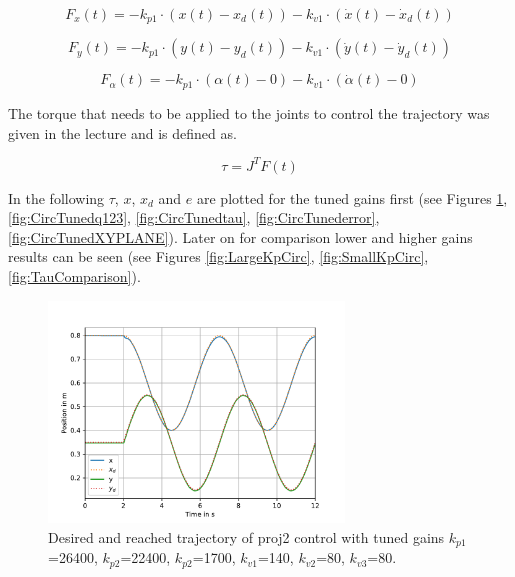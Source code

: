 \begin{equation}
    F_x(t)=-k_{p1}\cdot(x(t)-x_d(t)) - k_{v1}\cdot(\dot{x}(t) - \dot{x}_d(t))
\end{equation}

\begin{equation}
    F_y(t)=-k_{p1}\cdot(y(t)-y_d(t)) - k_{v1}\cdot(\dot{y}(t) - \dot{y}_d(t))
\end{equation}

\begin{equation}
    F_\alpha(t)=-k_{p1}\cdot(\alpha(t)-0) - k_{v1}\cdot(\dot{\alpha}(t) - 0)
\end{equation}

The torque that needs to be applied to the joints to control the trajectory was given in the lecture and is defined as.

\begin{equation}
    \tau= J^TF(t)
\end{equation}


In the following $\tau$, $x$, $x_d$ and $e$ are plotted for the tuned gains first (see Figures \ref{fig:CircTunedXXD}, \ref{fig:CircTunedq123}, \ref{fig:CircTunedtau}, \ref{fig:CircTunederror}, \ref{fig:CircTunedXYPLANE}). Later on for comparison lower and higher gains results can be seen (see Figures \ref{fig:LargeKpCirc}, \ref{fig:SmallKpCirc}, \ref{fig:TauComparison}). 

\begin{figure} [H]
   \begin{center}
        \includegraphics[width=0.7\textwidth]{SRC/CircleTraj_XandXd.pdf}
   \end{center}
  \caption{Desired and reached trajectory of proj2 control with tuned gains $k_{p1}$=26400, $k_{p2}$=22400, $k_{p2}$=1700, $k_{v1}$=140, $k_{v2}$=80, $k_{v3}$=80.}
  \label{fig:CircTunedXXD}
\end{figure}

